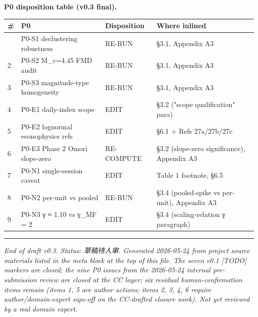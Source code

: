 \documentclass[
  11pt]{article}
\newcounter{none} %
\begin{document}
\textbf{P0 disposition table (v0.3 final).}

{\def\LTcaptype{none} %
\begin{longtable}[]{@{}llll@{}}
\toprule\noalign{}
\# & P0 & Disposition & Where inlined \\
\midrule\noalign{}
\endhead
\bottomrule\noalign{}
\endlastfoot
1 & P0-S1 declustering robustness & RE-RUN & §3.1, Appendix A3 \\
2 & P0-S2 M\_c=4.45 FMD audit & RE-RUN & §3.1, Appendix A3 \\
3 & P0-S3 magnitude-type homogeneity & RE-RUN & §3.1, Appendix A3 \\
4 & P0-E1 daily-index scope & EDIT & §3.2 ("scope qualification"
para) \\
5 & P0-E2 lognormal econophysics refs & EDIT & §6.1 + Refs
27a/27b/27c \\
6 & P0-E3 Phase 2 Omori slope-zero & RE-COMPUTE & §3.2 (slope-zero
significance), Appendix A3 \\
7 & P0-N1 single-session caveat & EDIT & Table 1 footnote, §6.5 \\
8 & P0-N2 per-unit vs pooled & RE-RUN & §3.4 (pooled-spike vs per-unit),
Appendix A3 \\
9 & P0-N3 γ ≈ 1.10 vs γ\_MF = 2 & EDIT & §3.4 (scaling-relation γ
paragraph) \\
\end{longtable}
}

\begin{center}\rule{0.5\linewidth}{0.5pt}\end{center}

\emph{End of draft v0.3. Status: 草稿待人审. Generated 2026-05-24 from
project source materials listed in the meta block at the top of this
file. The seven v0.1 {[}TODO{]} markers are closed; the nine P0 issues
from the 2026-05-24 internal pre-submission review are closed at the CC
layer; six residual human-confirmation items remain (items 1, 5 are
author actions; items 2, 3, 4, 6 require author/domain-expert sign-off
on the CC-drafted closure work). Not yet reviewed by a real domain
expert.}
\end{document}
